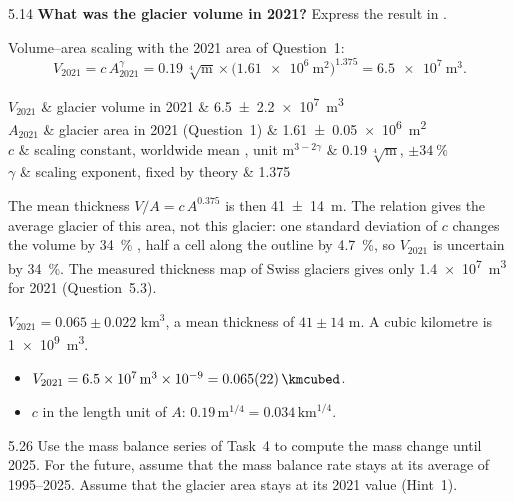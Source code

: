 \documentclass{scrartcl}
\renewcommand\unv[1]{#1}%
\begin{document}
\begin{reportpart}
\begin{question}{5.1}{4}
\textbf{What was the glacier volume in 2021?} Express the result in \unit{\kmcubed}.
\end{question}

\unv{Volume--area scaling with the 2021 area of Question~1:
\[
  V_{2021} = c\,A_{2021}^{\gamma} = 0.19\,\sqrt[4]{\mathrm{m}} \times
  \bigl(\qty{1.61e6}{\square\metre}\bigr)^{1.375} = \qty{6.5e7}{\cubic\metre} .
\]
\begin{symbols}
  $V_{2021}$ & glacier volume in 2021 & \qty{6.5 \pm 2.2 e7}{\cubic\metre} \\
  $A_{2021}$ & glacier area in 2021 (Question~1) & \qty{1.61 \pm 0.05 e6}{\square\metre} \\
  $c$ & scaling constant, worldwide mean \parencite{Bahr2015}, unit $\mathrm{m}^{3 - 2\gamma}$ & $0.19\,\sqrt[4]{\mathrm{m}}$, $\pm \qty{34}{\percent}$ \\
  $\gamma$ & scaling exponent, fixed by theory \parencite{Bahr1997} & 1.375 \\
\end{symbols}
The mean thickness $V/A = c\,A^{0.375}$ is then \qty{41 \pm 14}{\metre}. The relation gives the
average glacier of this area, not this glacier: one standard deviation of $c$ changes the
volume by \qty{34}{\percent} \parencite{Bahr2015}, half a cell along the outline by
\qty{4.7}{\percent}, so $V_{2021}$ is uncertain by \qty{34}{\percent}. The measured thickness
map of Swiss glaciers \parencite{Grab2021} gives only \qty{1.4e7}{\cubic\metre} for 2021
(Question~5.3).

\begin{converted}
$V_{2021} = 0.065 \pm 0.022$ km$^3$, a mean thickness of $41 \pm 14$ m. A cubic kilometre is
\qty{1e9}{\cubic\metre}.
\begin{itemize}
  \item $V_{2021} = \qty{6.5e7}{\cubic\metre} \times 10^{-9} = \qty{0.065 \pm 0.022}{\kmcubed}$.
  \item $c$ in the length unit of $A$: $0.19\,\mathrm{m}^{1/4} = 0.034\,\mathrm{km}^{1/4}$.
\end{itemize}
\end{converted}}

\begin{question}{5.2}{6}\label{q:52}
Use the mass balance series of Task~4 to compute the mass change until 2025. For the future,
assume that the mass balance rate stays at its average of 1995--2025. Assume that the glacier
area stays at its 2021 value (Hint~1).


\end{question}
\end{reportpart}
\end{document}
